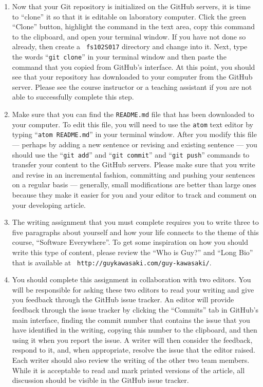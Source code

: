 \begin{enumerate}
  \item Now that your Git repository is initialized on the GitHub servers, it is time to ``clone'' it so that it is
    editable on laboratory computer. Click the green ``Clone'' button, highlight the command in the text area, copy this
    command to the clipboard, and open your terminal window. If you have not done so already, then create a {\tt
    fs102S017} directory and change into it. Next, type the words ``{\tt git clone}'' in your terminal window and then
    paste the command that you copied from GitHub's interface. At this point, you should see that your repository has
    downloaded to your computer from the GitHub server. Please see the course instructor or a teaching assistant if you
    are not able to successfully complete this step.

  \item Make sure that you can find the {\tt README.md} file that has been downloaded to your computer. To edit this
    file, you will need to use the {\tt atom} text editor by typing ``{\tt atom README.md}'' in your terminal window.
    After you modify this file --- perhaps by adding a new sentence or revising and existing sentence --- you should use
    the ``{\tt git add}'' and ``{\tt git commit}'' and ``{\tt git push}'' commands to transfer your content to the
    GitHub servers. Please make sure that you write and revise in an incremental fashion, committing and pushing your
    sentences on a regular basis --- generally, small modifications are better than large ones because they make it
    easier for you and your editor to track and comment on your developing article.

  \item The writing assignment that you must complete requires you to write three to five paragraphs about yourself and
    how your life connects to the theme of this course, ``Software Everywhere''. To get some inspiration on how you
    should write this type of content, please review the ``Who is Guy?'' and ``Long Bio'' that is available at {\tt
    http://guykawasaki.com/guy-kawasaki/}.

  \item You should complete this assignment in collaboration with two editors. You will be responsible for asking these
    two editors to read your writing and give you feedback through the GitHub issue tracker. An editor will provide
    feedback through the issue tracker by clicking the ``Commits'' tab in GitHub's main interface, finding the commit
    number that contains the issue that you have identified in the writing, copying this number to the clipboard, and
    then using it when you report the issue. A writer will then consider the feedback, respond to it, and, when
    appropriate, resolve the issue that the editor raised. Each writer should also review the writing of the other two
    team members. While it is acceptable to read and mark printed versions of the article, all discussion should be
    visible in the GitHub issue tracker.


\end{enumerate}
